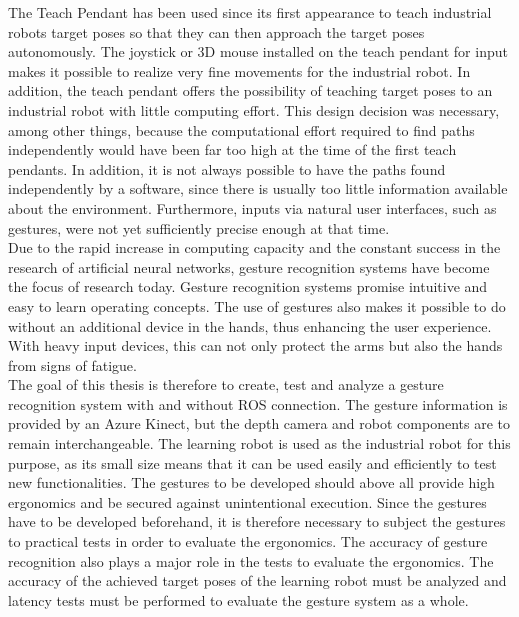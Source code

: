 The Teach Pendant has been used since its first appearance to teach industrial robots target poses so that they can then approach the target poses autonomously. The joystick or 3D mouse installed on the teach pendant for input makes it possible to realize very fine movements for the industrial robot. In addition, the teach pendant offers the possibility of teaching target poses to an industrial robot with little computing effort. This design decision was necessary, among other things, because the computational effort required to find paths independently would have been far too high at the time of the first teach pendants. In addition, it is not always possible to have the paths found independently by a software, since there is usually too little information available about the environment. Furthermore, inputs via natural user interfaces, such as gestures, were not yet sufficiently precise enough at that time.\\

Due to the rapid increase in computing capacity and the constant success in the research of artificial neural networks, gesture recognition systems have become the focus of research today. Gesture recognition systems promise intuitive and easy to learn operating concepts. The use of gestures also makes it possible to do without an additional device in the hands, thus enhancing the user experience. With heavy input devices, this can not only protect the arms but also the hands from signs of fatigue.\\

The goal of this thesis is therefore to create, test and analyze a gesture recognition system with and without ROS connection. The gesture information is provided by an Azure Kinect, but the depth camera and robot components are to remain interchangeable. The  learning robot is used as the industrial robot for this purpose, as its small size means that it can be used easily and efficiently to test new functionalities. The gestures to be developed should above all provide high ergonomics and be secured against unintentional execution. Since the gestures have to be developed beforehand, it is therefore necessary to subject the gestures to practical tests in order to evaluate the ergonomics. The accuracy of gesture recognition also plays a major role in the tests to evaluate the ergonomics. The accuracy of the achieved target poses of the  learning robot must be analyzed and latency tests must be performed to evaluate the gesture system as a whole.
